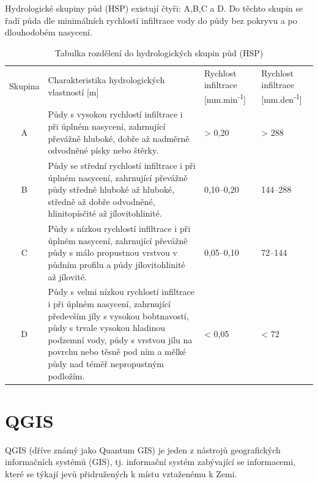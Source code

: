 \documentclass[a4paper,oneside,12pt]{book}
\begin{document}
\hspace{10mm} Hydrologické skupiny půd (HSP) existují čtyři: A,B,C a D. Do těchto skupin se řadí půda dle minimálních rychlostí infiltrace vody do půdy bez pokryvu a po dlouhodobém nasycení.\cite{MNYDGwleJOjKdRUp}\cite{MNYDGwleJOjKLRU2}
\begin{table}[htbp]
  \centering
  \caption{Tabulka rozdělení do hydrologických skupin půd (HSP) \cite{MNYDGwleJOjKLRU2}} 
  \label{tab:HSP}
  \begin{tabular}{|c|p{6cm}|p{2.5cm}|p{2.5cm}|}
    \hline
    Skupina & Charakteristika hydrologických vlastností [m] & 
    Rychlost infiltrace [mm.min\textsuperscript{-1}] & Rychlost infiltrace [mm.den\textsuperscript{-1}] \\
    \hhline{=|=|=|=|}
    A & Půdy s vysokou rychlostí infiltrace i při úplném nasycení, zahrnující převážně hluboké, dobře až nadměrně odvodněné písky nebo štěrky. & > 0,20 & > 288 \\
    \hline
    B & Půdy se střední rychlostí infiltrace i při úplném nasycení, zahrnující převážně půdy středně hluboké až hluboké, středně až dobře odvodněné, hlinitopísčité až jílovitohlinité. & 0,10–0,20 & 144–288 \\
    \hline
    C & Půdy s nízkou rychlostí infiltrace i při úplném nasycení, zahrnující převážně půdy s málo propustnou vrstvou v půdním profilu a půdy jílovitohlinité až jílovité. & 0,05–0,10 & 72–144 \\
    \hline
    D & Půdy s velmi nízkou rychlostí infiltrace i při úplném nasycení, zahrnující především jíly s vysokou bobtnavostí, půdy s trvale vysokou hladinou podzemní vody, půdy s vrstvou jílu na povrchu nebo těsně pod ním a mělké půdy nad téměř nepropustným podložím. & < 0,05 & < 72 \\
    \hline
  \end{tabular}
  
\end{table}

\newpage
\section{QGIS} \label{qgis}
\hspace{10mm} QGIS (dříve známý jako Quantum GIS) je jeden z nástrojů geografických informačních systémů (GIS), tj.  informační systém zabývající se informacemi, které se týkají jevů přidružených k místu vztaženému k Zemi. \cite{dONaeOjXanl1W2md}
\end{document}
